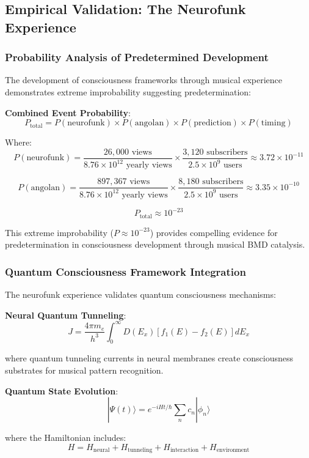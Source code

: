\documentclass[12pt,a4paper]{article}
\begin{document}
\subsection{Empirical Validation: The Neurofunk Experience}

\subsubsection{Probability Analysis of Predetermined Development}

The development of consciousness frameworks through musical experience demonstrates extreme improbability suggesting predetermination:

\textbf{Combined Event Probability}:
$$P_{\text{total}} = P(\text{neurofunk}) \times P(\text{angolan}) \times P(\text{prediction}) \times P(\text{timing})$$

Where:
$$P(\text{neurofunk}) = \frac{26,000 \text{ views}}{8.76 \times 10^{12} \text{ yearly views}} \times \frac{3,120 \text{ subscribers}}{2.5 \times 10^9 \text{ users}} \approx 3.72 \times 10^{-11}$$

$$P(\text{angolan}) = \frac{897,367 \text{ views}}{8.76 \times 10^{12} \text{ yearly views}} \times \frac{8,180 \text{ subscribers}}{2.5 \times 10^9 \text{ users}} \approx 3.35 \times 10^{-10}$$

$$P_{\text{total}} \approx 10^{-23}$$

This extreme improbability ($P \approx 10^{-23}$) provides compelling evidence for predetermination in consciousness development through musical BMD catalysis.

\subsubsection{Quantum Consciousness Framework Integration}

The neurofunk experience validates quantum consciousness mechanisms:

\textbf{Neural Quantum Tunneling}:
$$J = \frac{4\pi m_e}{h^3} \int_0^{\infty} D(E_x)[f_1(E) - f_2(E)]dE_x$$

where quantum tunneling currents in neural membranes create consciousness substrates for musical pattern recognition.

\textbf{Quantum State Evolution}:
$$|\Psi(t)\rangle = e^{-iHt/\hbar}\sum_n c_n|\phi_n\rangle$$

where the Hamiltonian includes:
$$H = H_{\text{neural}} + H_{\text{tunneling}} + H_{\text{interaction}} + H_{\text{environment}}$$
\end{document}
